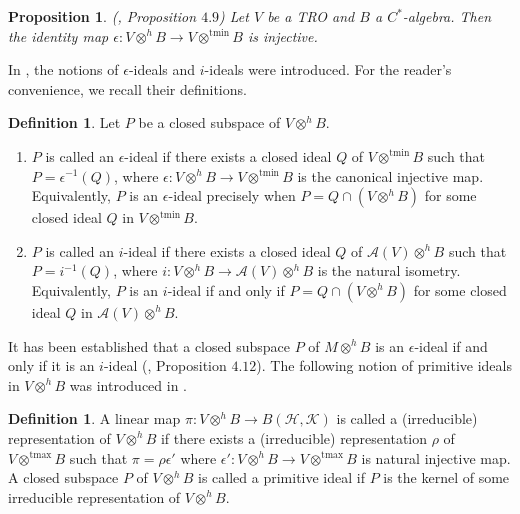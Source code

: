 \documentclass{birkjour}
\newtheorem{prop}[thm]{Proposition}
\theoremstyle{definition}
\newtheorem{defn}[thm]{Definition}
\theoremstyle{remark}
\numberwithin{equation}{section}
\begin{document}
 \begin{prop} (\cite{AKKKK}, Proposition $4.9$)
Let $V$ be a TRO and $B$ a $C^{\ast}$-algebra. Then the identity map $\epsilon: V \otimes^h B \to V \otimes^{\text{tmin}} B$ is injective.  
\end{prop} 

In \cite{AKKKK}, the notions of \(\epsilon\)-ideals and \(i\)-ideals were introduced. For the reader's convenience, we recall their definitions.

\begin{defn}  Let $P$ be a closed subspace of $V \otimes^h B$.
\begin{enumerate}
    \item[(i)] $P$ is called an \(\epsilon\)-ideal if there exists a closed ideal \( Q \) of \( V \otimes^{\text{tmin}} B \) such that \( P = \epsilon^{-1}(Q) \), where \( \epsilon: V \otimes^h B \to V \otimes^{\text{tmin}} B \) is the canonical injective map. Equivalently,  \( P \) is an \(\epsilon\)-ideal precisely when \( P = Q \cap (V \otimes^h B) \) for some closed ideal \( Q \) in \( V \otimes^{\text{tmin}} B \).  

\item[(ii)] $P$ is called an \( i \)-ideal if there exists a closed ideal \( Q \) of \( \mathcal{A}(V) \otimes^h B \) such that \( P = i^{-1}(Q) \), where \( i: V \otimes^h B \to \mathcal{A}(V)\otimes^h B \) is the natural isometry. Equivalently, \( P \) is an \( i \)-ideal if and only if \( P = Q \cap (V \otimes^h B) \) for some closed ideal \( Q \) in \( \mathcal{A}(V) \otimes^h B \).  
\end{enumerate}

\end{defn}  



It has been established that a closed subspace \( P \) of \( M \otimes^h B \) is an \(\epsilon\)-ideal if and only if it is an \( i \)-ideal (\cite{AKKKK}, Proposition $4.12$). The following notion of primitive ideals in $V \otimes^h B$ was introduced in \cite{AA}. 


\begin{defn}
    A linear map $\pi: V \otimes^h B \to B(\mathcal{H}, \mathcal{K})$ is called a (irreducible) representation of $V \otimes^h B$ if there exists a (irreducible) representation $\rho$ of $V \otimes^{\text{tmax}} B$ such that $\pi= \rho  \epsilon' $ where $\epsilon': V \otimes^h B \to V \otimes^{\text{tmax}} B$ is natural injective map. A closed subspace $P$ of $V \otimes^h B$ is called a primitive ideal if $P$ is the kernel of some irreducible representation  of $V \otimes^h B$.
\end{defn}
\end{document}
